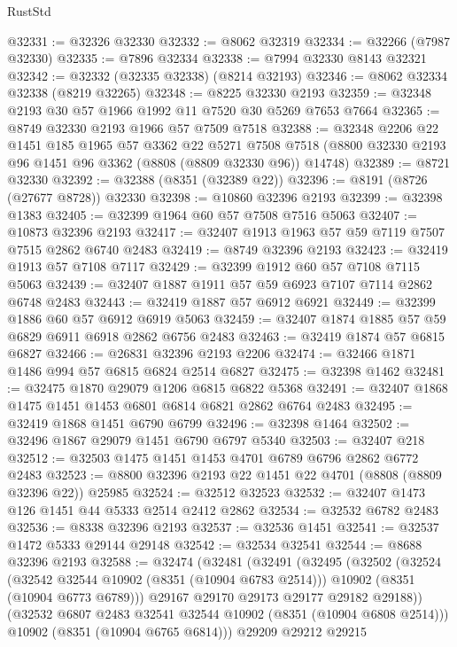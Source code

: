 \begin{lexlean}{RustStd}
\begin{coremodule}
@32331 := @32326 @32330
@32332 := @8062 @32319
@32334 := @32266 (@7987 @32330)
@32335 := @7896 @32334
@32338 := @7994 @32330 @8143 @32321
@32342 := @32332 (@32335 @32338) (@8214 @32193)
@32346 := @8062 @32334 @32338 (@8219 @32265)
@32348 := @8225 @32330 @2193
@32359 := @32348 @2193 @30 @57 @1966 @1992 @11 @7520 @30 @5269 @7653 @7664
@32365 := @8749 @32330 @2193 @1966 @57 @7509 @7518
@32388 := @32348
    @2206
    @22
    @1451
    @185
    @1965
    @57
    @3362
    @22
    @5271
    @7508
    @7518
    (@8800 @32330 @2193 @96 @1451 @96 @3362 (@8808 (@8809 @32330 @96)) @14748)
@32389 := @8721 @32330
@32392 := @32388 (@8351 (@32389 @22))
@32396 := @8191 (@8726 (@27677 @8728)) @32330
@32398 := @10860 @32396 @2193
@32399 := @32398 @1383
@32405 := @32399 @1964 @60 @57 @7508 @7516 @5063
@32407 := @10873 @32396 @2193
@32417 := @32407 @1913 @1963 @57 @59 @7119 @7507 @7515 @2862 @6740 @2483
@32419 := @8749 @32396 @2193
@32423 := @32419 @1913 @57 @7108 @7117
@32429 := @32399 @1912 @60 @57 @7108 @7115 @5063
@32439 := @32407 @1887 @1911 @57 @59 @6923 @7107 @7114 @2862 @6748 @2483
@32443 := @32419 @1887 @57 @6912 @6921
@32449 := @32399 @1886 @60 @57 @6912 @6919 @5063
@32459 := @32407 @1874 @1885 @57 @59 @6829 @6911 @6918 @2862 @6756 @2483
@32463 := @32419 @1874 @57 @6815 @6827
@32466 := @26831 @32396 @2193 @2206
@32474 := @32466 @1871 @1486 @994 @57 @6815 @6824 @2514 @6827
@32475 := @32398 @1462
@32481 := @32475 @1870 @29079 @1206 @6815 @6822 @5368
@32491 := @32407 @1868 @1475 @1451 @1453 @6801 @6814 @6821 @2862 @6764 @2483
@32495 := @32419 @1868 @1451 @6790 @6799
@32496 := @32398 @1464
@32502 := @32496 @1867 @29079 @1451 @6790 @6797 @5340
@32503 := @32407 @218
@32512 := @32503 @1475 @1451 @1453 @4701 @6789 @6796 @2862 @6772 @2483
@32523 := @8800 @32396 @2193 @22 @1451 @22 @4701 (@8808 (@8809 @32396 @22)) @25985
@32524 := @32512 @32523
@32532 := @32407 @1473 @126 @1451 @44 @5333 @2514 @2412 @2862
@32534 := @32532 @6782 @2483
@32536 := @8338 @32396 @2193
@32537 := @32536 @1451
@32541 := @32537 @1472 @5333 @29144 @29148
@32542 := @32534 @32541
@32544 := @8688 @32396 @2193
@32588 := @32474
    (@32481
      (@32491
        (@32495
          (@32502
            (@32524
              (@32542 @32544 @10902 (@8351 (@10904 @6783 @2514)))
              @10902
              (@8351 (@10904 @6773 @6789)))
            @29167
            @29170
            @29173
            @29177
            @29182
            @29188))
        (@32532 @6807 @2483 @32541 @32544 @10902 (@8351 (@10904 @6808 @2514)))
        @10902
        (@8351 (@10904 @6765 @6814)))
      @29209
      @29212
      @29215

\end{coremodule}
\end{lexlean}
